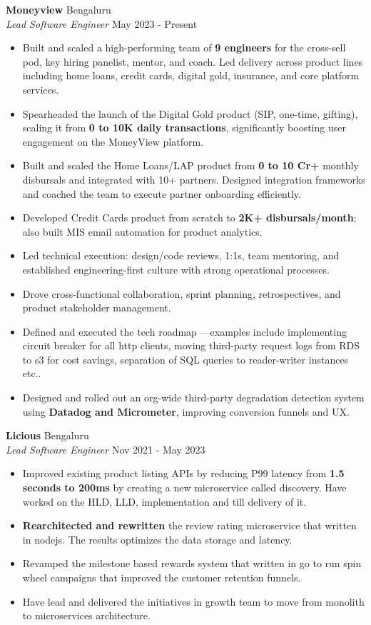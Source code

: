 \documentclass[a4paper]{article}
\begin{document}
\textbf{Moneyview} \hfill Bengaluru\\
\textit{Lead Software Engineer} \hfill May 2023 - Present\\
\vspace{-1mm}
\begin{itemize} \itemsep 1pt
	\item Built and scaled a high-performing team of \textbf{9 engineers} for the cross-sell pod, key hiring panelist, mentor, and coach. Led delivery across product lines including home loans, credit cards, digital gold, insurance, and core platform services.
	\item Spearheaded the launch of the Digital Gold product (SIP, one-time, gifting), scaling it from \textbf{0 to 10K daily transactions}, significantly boosting user engagement on the MoneyView platform.
	\item Built and scaled the Home Loans/LAP product from \textbf{0 to 10 Cr+} monthly disbursals and integrated with 10+ partners. Designed integration frameworks and coached the team to execute partner onboarding efficiently.
	\item Developed Credit Cards product from scratch to \textbf{2K+ disbursals/month}; also built MIS email automation for product analytics.
	\item Led technical execution: design/code reviews, 1:1s, team mentoring, and established engineering-first culture with strong operational processes.
	\item Drove cross-functional collaboration, sprint planning, retrospectives, and product stakeholder management.
	\item Defined and executed the tech roadmap —examples include implementing circuit breaker for all http clients, moving third-party request logs from RDS to s3 for cost savings, separation of SQL queries to reader-writer instances etc..
	\item Designed and rolled out an org-wide third-party degradation detection system using \textbf{Datadog and Micrometer}, improving conversion funnels and UX.
\end{itemize}
\textbf{Licious} \hfill Bengaluru\\
\textit{Lead Software Engineer} \hfill Nov 2021 - May 2023\\
\vspace{-1mm}
\begin{itemize} \itemsep 1pt
	\item Improved existing product listing APIs by reducing P99 latency from \textbf{1.5 seconds to 200ms} by creating a new microservice called discovery. Have worked on the HLD, LLD, implementation and till delivery of it.
	\item \textbf{Rearchitected and rewritten} the review rating microservice that written in nodejs. The results optimizes the data storage and latency.
	\item Revamped the milestone based rewards system that written in go to run spin wheel campaigns that improved the customer retention funnels.
	\item Have lead and delivered the initiatives in growth team to move from monolith to microservices architecture.
\end{itemize}
\end{document}
